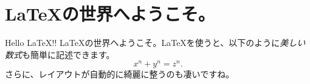 \documentclass{ltjsarticle}
\begin{document}
\section{\LaTeX の世界へようこそ。}
Hello \LaTeX !! \LaTeX の世界へようこそ。\LaTeX を使うと、以下のように\textit{美しい数式}も簡単に記述できます。
\[x^n + y^n = z^n.\]
さらに、レイアウトが自動的に綺麗に整うのも凄いですね。
\end{document}
